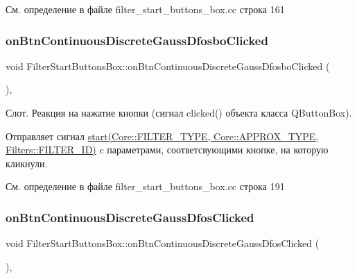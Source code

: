 См. определение в файле filter\+\_\+start\+\_\+buttons\+\_\+box.\+cc строка 161

\hypertarget{class_filter_start_buttons_box_af89dad25104363913b9a965cbfd417e8}{}\label{class_filter_start_buttons_box_af89dad25104363913b9a965cbfd417e8} 
\subsubsection{\texorpdfstring{on\+Btn\+Continuous\+Discrete\+Gauss\+Dfosbo\+Clicked}{onBtnContinuousDiscreteGaussDfosboClicked}}
{\footnotesize\ttfamily void Filter\+Start\+Buttons\+Box\+::on\+Btn\+Continuous\+Discrete\+Gauss\+Dfosbo\+Clicked (\begin{DoxyParamCaption}{ }\end{DoxyParamCaption})\hspace{0.3cm}{\ttfamily [private]}, {\ttfamily [slot]}}

Слот. Реакция на нажатие кнопки (сигнал clicked() объекта класса Q\+Button\+Box).

Отправляет сигнал \hyperlink{class_filter_start_buttons_box_ac6e2a6555f1d388391f188f834b8e753}{start(\+Core\+::\+F\+I\+L\+T\+E\+R\+\_\+\+T\+Y\+P\+E, Core\+::\+A\+P\+P\+R\+O\+X\+\_\+\+T\+Y\+P\+E, Filters\+::\+F\+I\+L\+T\+E\+R\+\_\+\+I\+D)} c параметрами, соответсвующими кнопке, на которую кликнули. 

См. определение в файле filter\+\_\+start\+\_\+buttons\+\_\+box.\+cc строка 191

\hypertarget{class_filter_start_buttons_box_a928032e48d077e6e05f522c5a63efde3}{}\label{class_filter_start_buttons_box_a928032e48d077e6e05f522c5a63efde3} 
\subsubsection{\texorpdfstring{on\+Btn\+Continuous\+Discrete\+Gauss\+Dfos\+Clicked}{onBtnContinuousDiscreteGaussDfosClicked}}
{\footnotesize\ttfamily void Filter\+Start\+Buttons\+Box\+::on\+Btn\+Continuous\+Discrete\+Gauss\+Dfos\+Clicked (\begin{DoxyParamCaption}{ }\end{DoxyParamCaption})\hspace{0.3cm}{\ttfamily [private]}, {\ttfamily [slot]}}

